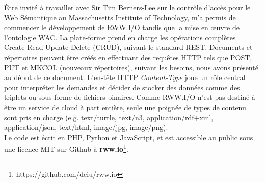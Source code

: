 Être invité à travailler avec Sir Tim Berners-Lee sur le contrôle d'accès pour le Web Sémantique au Massachusetts Institute of Technology, m'a permis de commencer le développement de RWW.I/O tandis que la mise en œuvre de l'ontologie WAC. La plate-forme prend en charge les opérations complètes Create-Read-Update-Delete (CRUD), suivant le standard REST. Documents et répertoires peuvent être créés en effectuant des requêtes HTTP tels que POST, PUT et MKCOL (nouveaux répertoires), suivant les besoins, nous avons présenté au début de ce document. L'en-tête HTTP \textit{Content-Type} joue un rôle central pour interpréter les demandes et décider de stocker des données comme des triplets ou sous forme de fichiers binaires. Comme RWW.I/O n'est pas destiné à être un service de cloud à part entière, seule une poignée de types de contenu sont pris en charge (e.g. text/turtle, text/n3, application/rdf+xml, application/json, text/html, image/jpg, image/png).\\


Le code est écrit en PHP, Python et JavaScript, et est accessible au public sous une licence MIT sur Github à \textbf{rww.io}\footnote{https://github.com/deiu/rww.io}.


